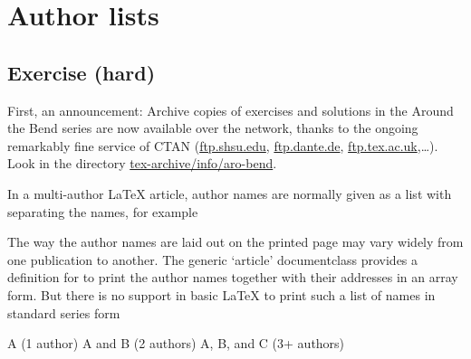 \chapter{Author lists}


\section{Exercise (hard)}


First, an 
announcement: Archive copies of exercises and solutions in the 
Around the Bend series are now available over the network, thanks to the 
ongoing remarkably fine service of CTAN (\url{ftp.shsu.edu}, 
\url{ftp.dante.de}, \url{ftp.tex.ac.uk},\ldots). Look in the directory 
\url{tex-archive/info/aro-bend}.


In a multi-author LaTeX article, author names are normally given 
as a list with \cmd{\and} separating the names, for example

The way the author names are laid out on the printed page may 
vary widely from one publication to another. The generic 
`article' documentclass provides a definition for \cmd{\and} to print 
the author names together with their addresses in an array form. 
But there is no support in basic LaTeX to print such a list of 
names in standard series form 
\begin{lcode}
A            (1 author)
A and B      (2 authors)
A, B, and C  (3+ authors)
\end{lcode}

